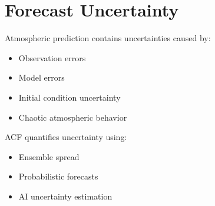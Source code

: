 \section{Forecast Uncertainty}


Atmospheric prediction contains uncertainties caused by:


\begin{itemize}

\item Observation errors

\item Model errors

\item Initial condition uncertainty

\item Chaotic atmospheric behavior

\end{itemize}



ACF quantifies uncertainty using:


\begin{itemize}

\item Ensemble spread

\item Probabilistic forecasts

\item AI uncertainty estimation

\end{itemize}

